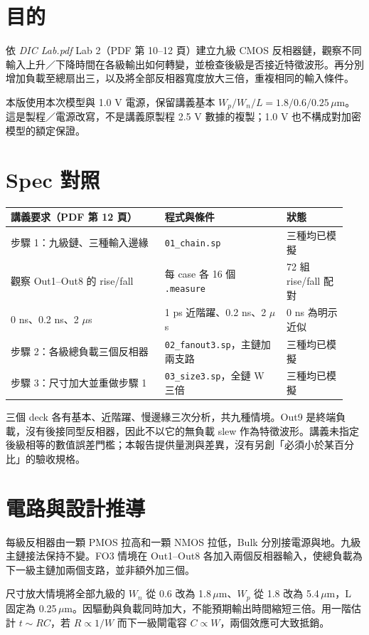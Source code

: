 \section{目的}
依 \textit{DIC Lab.pdf} Lab 2（PDF 第 10--12 頁）建立九級 CMOS 反相器鏈，觀察不同輸入上升／下降時間在各級輸出如何轉變，並檢查後級是否接近特徵波形。再分別增加負載至總扇出三，以及將全部反相器寬度放大三倍，重複相同的輸入條件。

本版使用本次模型與 1.0 V 電源，保留講義基本 $W_p/W_n/L=1.8/0.6/0.25\,\mu\mathrm m$。這是製程／電源改寫，不是講義原製程 2.5 V 數據的複製；1.0 V 也不構成對加密模型的額定保證。

\section{Spec 對照}
\begin{center}
\setlength{\tabcolsep}{3pt}
\begin{tabular}{p{0.43\linewidth}p{0.34\linewidth}p{0.17\linewidth}}
\toprule
講義要求（PDF 第 12 頁） & 程式與條件 & 狀態 \\
\midrule
步驟 1：九級鏈、三種輸入邊緣 & \texttt{01\_chain.sp} & 三種均已模擬 \\
觀察 Out1--Out8 的 rise/fall & 每 case 各 16 個 \texttt{.measure} & 72 組 rise/fall 配對 \\
0 ns、0.2 ns、2 $\mu$s & 1 ps 近階躍、0.2 ns、2 $\mu$s & 0 ns 為明示近似 \\
步驟 2：各級總負載三個反相器 & \texttt{02\_fanout3.sp}，主鏈加兩支路 & 三種均已模擬 \\
步驟 3：尺寸加大並重做步驟 1 & \texttt{03\_size3.sp}，全鏈 W 三倍 & 三種均已模擬 \\
\bottomrule
\end{tabular}
\end{center}

三個 deck 各有基本、近階躍、慢邊緣三次分析，共九種情境。Out9 是終端負載，沒有後接同型反相器，因此不以它的無負載 slew 作為特徵波形。講義未指定後級相等的數值誤差門檻；本報告提供量測與差異，沒有另創「必須小於某百分比」的驗收規格。

\section{電路與設計推導}
每級反相器由一顆 PMOS 拉高和一顆 NMOS 拉低，Bulk 分別接電源與地。九級主鏈接法保持不變。FO3 情境在 Out1--Out8 各加入兩個反相器輸入，使總負載為下一級主鏈加兩個支路，並非額外加三個。

尺寸放大情境將全部九級的 $W_n$ 從 0.6 改為 1.8\,$\mu$m、$W_p$ 從 1.8 改為 5.4\,$\mu$m，L 固定為 0.25\,$\mu$m。因驅動與負載同時加大，不能預期輸出時間縮短三倍。用一階估計 $t\sim RC$，若 $R\propto1/W$ 而下一級閘電容 $C\propto W$，兩個效應可大致抵銷。

